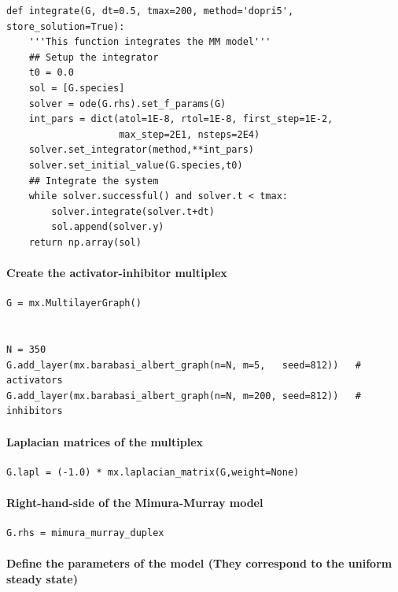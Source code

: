 \documentclass[11pt]{article}
\begin{document}
\begin{verbatim}
def integrate(G, dt=0.5, tmax=200, method='dopri5', store_solution=True):
    '''This function integrates the MM model'''
    ## Setup the integrator 
    t0 = 0.0
    sol = [G.species]
    solver = ode(G.rhs).set_f_params(G)
    int_pars = dict(atol=1E-8, rtol=1E-8, first_step=1E-2,
                    max_step=2E1, nsteps=2E4)
    solver.set_integrator(method,**int_pars)
    solver.set_initial_value(G.species,t0)
    ## Integrate the system    
    while solver.successful() and solver.t < tmax:
        solver.integrate(solver.t+dt)
        sol.append(solver.y)
    return np.array(sol)
\end{verbatim}

\paragraph{Create the activator-inhibitor
multiplex}\label{create-the-activator-inhibitor-multiplex}

\begin{verbatim}
G = mx.MultilayerGraph()


N = 350
G.add_layer(mx.barabasi_albert_graph(n=N, m=5,   seed=812))   # activators
G.add_layer(mx.barabasi_albert_graph(n=N, m=200, seed=812))   # inhibitors
\end{verbatim}

\paragraph{Laplacian matrices of the
multiplex}\label{laplacian-matrices-of-the-multiplex}

\begin{verbatim}
G.lapl = (-1.0) * mx.laplacian_matrix(G,weight=None)
\end{verbatim}

\paragraph{Right-hand-side of the Mimura-Murray
model}\label{right-hand-side-of-the-mimura-murray-model}

\begin{verbatim}
G.rhs = mimura_murray_duplex
\end{verbatim}

\paragraph{Define the parameters of the model (They correspond to the
uniform steady
state)}\label{define-the-parameters-of-the-model-they-correspond-to-the-uniform-steady-state}
\end{document}
